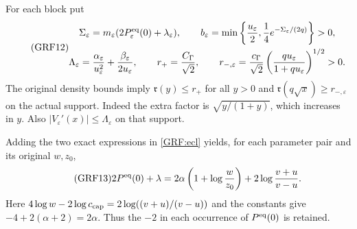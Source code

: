 \documentclass[11pt,a4paper]{article}
\begin{document}
For each block put
\begin{equation*}\tag{GRF12}\label{GRF:parameters}
 \begin{gathered}
 \Sigma_\varepsilon=m_\varepsilon
                  (2P^{\rm eq}_\varepsilon(0)+\lambda_\varepsilon),\qquad
 b_\varepsilon=\min\left\{\frac{u_\varepsilon}{2},
             \frac14e^{-\Sigma_\varepsilon/(2q)}\right\}>0,\\
 \Lambda_\varepsilon=\frac{\alpha_\varepsilon}{u_\varepsilon^2}
                     +\frac{\beta_\varepsilon}{2u_\varepsilon},\qquad
 r_+=\frac{C_\Gamma}{\sqrt2},\qquad
 r_{-,\varepsilon}=\frac{c_\Gamma}{\sqrt2}
       \left(\frac{qu_\varepsilon}{1+qu_\varepsilon}\right)^{1/2}>0.
 \end{gathered}
\end{equation*}
The original density bounds imply
$\mathfrak r(y)\le r_+$ for all $y>0$ and
$\mathfrak r(q\sqrt x)\ge r_{-,\varepsilon}$ on the actual support.
Indeed the extra factor is $\sqrt{y/(1+y)}$, which increases in $y$.
Also $|V_\varepsilon'(x)|\le\Lambda_\varepsilon$ on that support.

Adding the two exact expressions in \eqref{GRF:ecl} yields, for each parameter
pair and its original $w,z_0$,
\begin{equation*}\tag{GRF13}\label{GRF:sigmaformula}
 2P^{\rm eq}(0)+\lambda
 =2\alpha\left(1+\log\frac{w}{z_0}\right)
       +2\log\frac{v+u}{v-u}.
\end{equation*}
Here $4\log w-2\log c_{\rm cap}
=2\log((v+u)/(v-u))$ and the constants give
$-4+2(\alpha+2)=2\alpha$. Thus the $-2$ in each occurrence of
$P^{\rm eq}(0)$ is retained.
\end{document}
